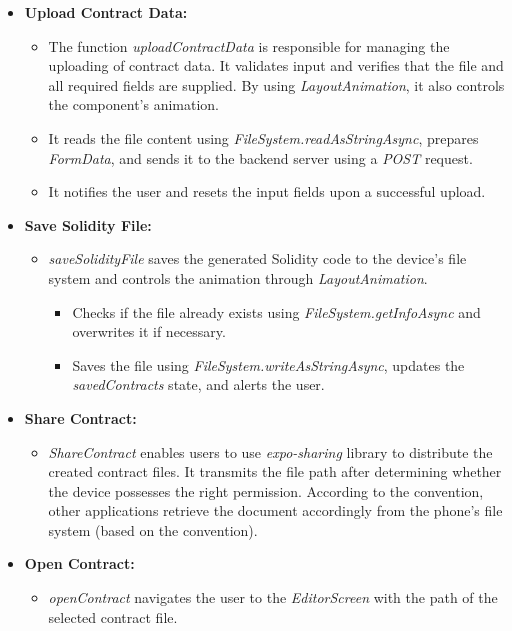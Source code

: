 \begin{itemize}
    \item \textbf{Upload Contract Data:}
    \begin{itemize}
        \item The function \textit{uploadContractData} is responsible for managing the uploading of contract data. It validates input and verifies that the file and all required fields are supplied. By using \textit{LayoutAnimation}, it also controls the component's animation.
        \item It reads the file content using \textit{FileSystem.readAsStringAsync}, prepares \textit{FormData}, and sends it to the backend server using a \textit{POST} request.
        \item It notifies the user and resets the input fields upon a successful upload.
    \end{itemize}

    \item \textbf{Save Solidity File:}
    \begin{itemize}
        \item \textit{saveSolidityFile} saves the generated Solidity code to the device's file system and controls the animation through \textit{LayoutAnimation}.
        \begin{itemize}
            \item Checks if the file already exists using \textit{FileSystem.getInfoAsync} and overwrites it if necessary.
            \item Saves the file using \textit{FileSystem.writeAsStringAsync}, updates the \textit{savedContracts} state, and alerts the user.
        \end{itemize}
    \end{itemize}

    \item \textbf{Share Contract:}
    \begin{itemize}
        \item \textit{ShareContract} enables users to use \textit{expo-sharing} library to distribute the created contract files. It transmits the file path after determining whether the device possesses the right permission. According to the convention, other applications retrieve the document accordingly from the phone's file system (based on the convention).
    \end{itemize}

    \item \textbf{Open Contract:}
    \begin{itemize}
        \item \textit{openContract} navigates the user to the \textit{EditorScreen} with the path of the selected contract file.
    \end{itemize}


\end{itemize}
